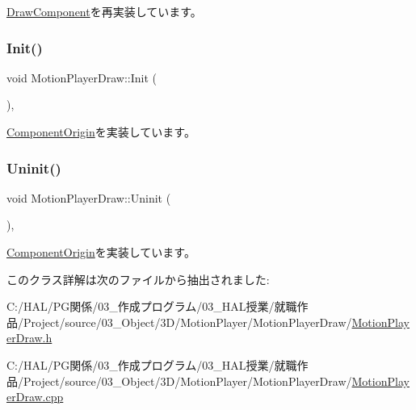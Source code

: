 \mbox{\hyperlink{class_draw_component_a5f3bbcc8e563b740c0a5535170921c75}{Draw\+Component}}を再実装しています。

\mbox{\label{class_motion_player_draw_a239ef4dbc11dffb9a209d8e07e0847d0}} 
\subsubsection{\texorpdfstring{Init()}{Init()}}
{\footnotesize\ttfamily void Motion\+Player\+Draw\+::\+Init (\begin{DoxyParamCaption}{ }\end{DoxyParamCaption})\hspace{0.3cm}{\ttfamily [override]}, {\ttfamily [virtual]}}



\mbox{\hyperlink{class_component_origin_a9f674891257f2272b1636d8b6bb05d81}{Component\+Origin}}を実装しています。

\mbox{\label{class_motion_player_draw_a392cb581981fc81976b1328d17f95b4f}} 
\subsubsection{\texorpdfstring{Uninit()}{Uninit()}}
{\footnotesize\ttfamily void Motion\+Player\+Draw\+::\+Uninit (\begin{DoxyParamCaption}{ }\end{DoxyParamCaption})\hspace{0.3cm}{\ttfamily [override]}, {\ttfamily [virtual]}}



\mbox{\hyperlink{class_component_origin_a9f89a93f9c1954bd53f9750e35e6089d}{Component\+Origin}}を実装しています。



このクラス詳解は次のファイルから抽出されました\+:\begin{DoxyCompactItemize}
\item 
C\+:/\+H\+A\+L/\+P\+G関係/03\+\_\+作成プログラム/03\+\_\+\+H\+A\+L授業/就職作品/\+Project/source/03\+\_\+\+Object/3\+D/\+Motion\+Player/\+Motion\+Player\+Draw/\mbox{\hyperlink{_motion_player_draw_8h}{Motion\+Player\+Draw.\+h}}\item 
C\+:/\+H\+A\+L/\+P\+G関係/03\+\_\+作成プログラム/03\+\_\+\+H\+A\+L授業/就職作品/\+Project/source/03\+\_\+\+Object/3\+D/\+Motion\+Player/\+Motion\+Player\+Draw/\mbox{\hyperlink{_motion_player_draw_8cpp}{Motion\+Player\+Draw.\+cpp}}\end{DoxyCompactItemize}
